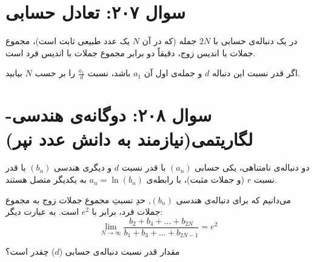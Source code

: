 \documentclass[12pt]{article}
\begin{document}
\vspace{1cm}
\hrulefill
\vspace{1cm}


\section*{سوال ۲۰۷: تعادل حسابی}
در یک دنباله‌ی حسابی با $2N$ جمله (که در آن $N$ یک عدد طبیعی ثابت است)، مجموع جملات با اندیس زوج، دقیقاً دو برابر مجموع جملات با اندیس فرد است.
\vspace{0.5cm}

اگر قدر نسبت این دنباله $d$ و جمله‌ی اول آن $a_1$ باشد، نسبت $\frac{a_1}{d}$ را بر حسب $N$ بیابید.

\vspace{1cm}
\hrulefill
\vspace{1cm}

\section*{سوال ۲۰۸: دوگانه‌ی هندسی-لگاریتمی(نیازمند به دانش عدد نپر)}
دو دنباله‌ی نامتناهی، یکی حسابی $(a_n)$ با قدر نسبت $d$ و دیگری هندسی $(b_n)$ با قدر نسبت $r$ (و جملات مثبت)، با رابطه‌ی $a_n = \ln(b_n)$ به یکدیگر متصل هستند.
\vspace{0.5cm}

می‌دانیم که برای دنباله‌ی هندسی $(b_n)$, حدِ نسبتِ مجموع جملات زوج به مجموع جملات فرد، برابر با $e^2$ است. به عبارت دیگر:
\[ \lim_{N \to \infty} \frac{b_2 + b_4 + \dots + b_{2N}}{b_1 + b_3 + \dots + b_{2N-1}} = e^2 \]


مقدار قدر نسبت دنباله‌ی حسابی ($d$) چقدر است؟

\vspace{1cm}
\hrulefill
\vspace{1cm}


\end{document}
